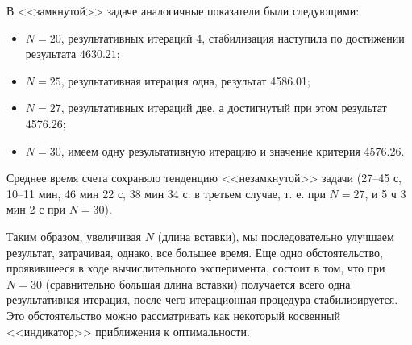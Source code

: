 В <<замкнутой>> задаче аналогичные показатели были следующими:

\begin{itemize}
  \item
  $N=20$, результативных итераций 4, стабилизация наступила по достижении результата $4630.21$;
  \item
  $N=25$, результативная итерация одна, результат 4586.01;
  \item
  $N=27$, результативных итераций две, а достигнутый при этом результат 4576.26;
  \item
  $N=30$, имеем одну результативную итерацию и значение критерия 4576.26.
\end{itemize}

Среднее время счета сохраняло тенденцию <<незамкнутой>>  задачи
(27--45 с, 10--11 мин,
46 мин 22 с, 38 мин 34 с. в третьем случае,
т. е. при $N=27$,
и 5 ч 3 мин 2 с при $N=30$).

Таким образом, увеличивая $N$
(длина вставки),
мы последовательно улучшаем результат,
затрачивая, однако, все большее время.
Еще одно обстоятельство,
проявившееся в ходе вычислительного эксперимента,
состоит в том, что при
$N=30$
(сравнительно большая длина вставки)
получается всего одна результативная итерация,
после чего итерационная процедура стабилизируется.
Это обстоятельство можно рассматривать как некоторый
косвенный <<индикатор>> приближения к оптимальности.

